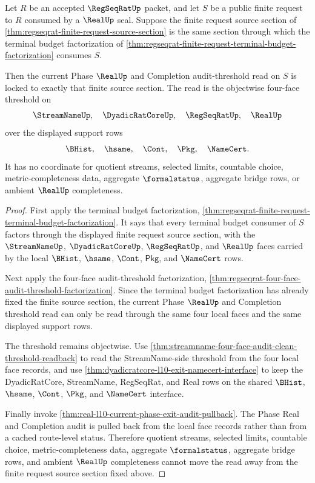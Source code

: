 \begin{theorem}
\label{thm:regseqrat-finite-request-audit-threshold-source-lock}
Let $R$ be an accepted $\RegSeqRatUp$ packet, and let $S$ be a public finite
request to $R$ consumed by a $\RealUp$ seal. Suppose the finite request source
section of \autoref{thm:regseqrat-finite-request-source-section} is the same
section through which the terminal budget factorization of
\autoref{thm:regseqrat-finite-request-terminal-budget-factorization} consumes
$S$.

Then the current Phase $\RealUp$ and Completion audit-threshold read on $S$ is
locked to exactly that finite source section. The read is the objectwise
four-face threshold on
$$
\StreamNameUp,\quad \DyadicRatCoreUp,\quad \RegSeqRatUp,\quad \RealUp
$$
over the displayed support rows
$$
\BHist,\quad \hsame,\quad \Cont,\quad \Pkg,\quad \NameCert.
$$
It has no coordinate for quotient streams, selected limits, countable choice,
metric-completeness data, aggregate $\formalstatus$, aggregate bridge rows, or
ambient $\RealUp$ completeness.
\end{theorem}
\begin{proof}
First apply the terminal budget factorization,
\autoref{thm:regseqrat-finite-request-terminal-budget-factorization}. It says
that every terminal budget consumer of $S$ factors through the displayed finite
request source section, with the $\StreamNameUp$, $\DyadicRatCoreUp$,
$\RegSeqRatUp$, and $\RealUp$ faces carried by the local $\BHist$, $\hsame$,
$\Cont$, $\mathsf{Pkg}$, and $\NameCert$ rows.

Next apply the four-face audit-threshold factorization,
\autoref{thm:regseqrat-four-face-audit-threshold-factorization}. Since the
terminal budget factorization has already fixed the finite source section, the
current Phase $\RealUp$ and Completion threshold read can only be read through
the same four local faces and the same displayed support rows.

The threshold remains objectwise. Use
\autoref{thm:streamname-four-face-audit-clean-threshold-readback} to read the
StreamName-side threshold from the four local face records, and use
\autoref{thm:dyadicratcore-l10-exit-namecert-interface} to keep the
DyadicRatCore, StreamName, RegSeqRat, and Real rows on the shared $\BHist$,
$\hsame$, $\Cont$, $\Pkg$, and $\NameCert$ interface.

Finally invoke \autoref{thm:real-l10-current-phase-exit-audit-pullback}. The
Phase Real and Completion audit is pulled back from the local face records
rather than from a cached route-level status. Therefore quotient streams,
selected limits, countable choice, metric-completeness data, aggregate
$\formalstatus$, aggregate bridge rows, and ambient $\RealUp$ completeness
cannot move the read away from the finite request source section fixed above.
\end{proof}

